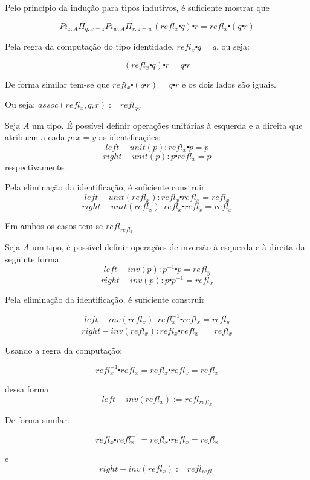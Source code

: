 \documentclass[../main.tex]{subfiles}
\begin{document}
Pelo princípio da indução para tipos indutivos, é suficiente mostrar que 

$$Pi_{z : A}\Pi_{q : x = z}Pi_{w : A}\Pi_{r : z = w} (refl_x \centerdot q) \centerdot r = refl_x \centerdot (q \centerdot r)$$

Pela regra da computação do tipo identidade, $refl_x \centerdot q = q$, ou seja:

$$(refl_x \centerdot q) \centerdot r = q \centerdot r$$

De forma similar tem-se que $refl_x \centerdot (q \centerdot r) = q \centerdot r$ e os dois lados são iguais.

Ou seja: $assoc(refl_x, q, r) := refl_{q \centerdot r}$

\begin{definition}
    Seja $A$ um tipo. É possível definir operações unitárias à esquerda e a direita que atribuem a cada $p : x = y$ as identificações:
    $$ left-unit(p) : refl_x \centerdot p = p$$
    $$right-unit(p) : p \centerdot refl_x = p$$
    respectivamente.
\end{definition}

Pela eliminação da identificação, é suficiente construir
$$ left-unit(refl_x) : refl_x \centerdot refl_x = refl_x$$
$$right-unit(refl_x) : refl_x \centerdot refl_x = refl_x$$

Em ambos os casos tem-se $refl_{refl_x}$

\begin{definition}
    Seja $A$ um tipo, é possível definir operações de inversão à esquerda e à direita da seguinte forma:
    $$ left-inv(p) : p^{-1} \centerdot p = refl_y$$
    $$right-inv(p) : p \centerdot p^{-1} = refl_x$$
\end{definition}

Pela eliminação da identificação, é suficiente construir


$$ left-inv(refl_x) : refl_x^{-1} \centerdot refl_x = refl_y$$
$$right-inv(refl_x) : refl_x \centerdot refl_x^{-1} = refl_x$$

Usando a regra da computação:

$$refl_x^{-1} \centerdot refl_x = refl_x \centerdot refl_x = refl_x$$

dessa forma $$left-inv(refl_x) := refl_{refl_x}$$

De forma similar:

$$refl_x \centerdot refl_x^{-1} = refl_x \centerdot refl_x = refl_x$$

e $$right-inv(refl_x) := refl_{refl_x}$$
\end{document}
